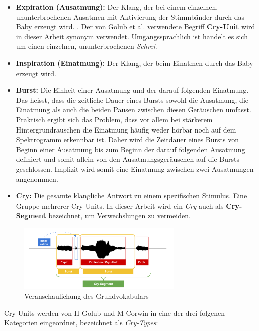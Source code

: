 \begin{itemize}
	\item \textbf{Expiration (Ausatmung):} Der Klang, der bei einem einzelnen, ununterbrochenen Ausatmen mit Aktivierung der Stimmbänder durch das Baby erzeugt wird. \cite{rythmic}. Der von Golub et al. \cite[S. 61]{cryModel} verwendete Begriff \textbf{Cry-Unit} wird in dieser Arbeit synonym verwendet. Umgangssprachlich ist handelt es sich um einen einzelnen, ununterbrochenen \emph{Schrei}.
	\item \textbf{Inspiration (Einatmung):} Der Klang, der beim Einatmen durch das Baby erzeugt wird.
	\item  \textbf{Burst:} Die Einheit einer Ausatmung und der darauf folgenden Einatmung. Das heisst, dass die zeitliche Dauer eines Bursts sowohl die Ausatmung, die Einatmung als auch die beiden Pausen zwischen diesen Geräuschen umfasst. Praktisch ergibt sich das Problem, dass vor allem bei stärkerem Hintergrundrauschen die Einatmung häufig weder hörbar noch auf dem Spektrogramm erkennbar ist. Daher wird die Zeitdauer eines Bursts von Beginn einer Ausatmung bis zum Beginn der darauf folgenden Ausatmung definiert und somit allein von den Ausatmungsgeräuschen auf die Bursts geschlossen. Implizit wird somit eine Einatmung zwischen zwei Ausatmungen angenommen.
	\item  \textbf{Cry:} Die gesamte klangliche Antwort zu einem spezifischen Stimulus. Eine Gruppe mehrerer Cry-Units.\cite[S. 61]{cryModel} In dieser Arbeit wird ein \emph{Cry} auch als \textbf{Cry-Segment} bezeichnet, um Verwechslungen zu vermeiden.
\end{itemize}

\begin{figure}
	\centering
	\includegraphics[width=0.7\textwidth]{bilder/cryVoc02.png}
	\caption{Veranschaulichung des Grundvokabulars}
	\label{img:cryVocabulary}
\end{figure}

Cry-Units werden von H Golub und M Corwin in eine der drei folgenen Kategorien eingeordnet, bezeichnet als \emph{Cry-Types}: \cite[S. 61 - 62]{cryModel}

